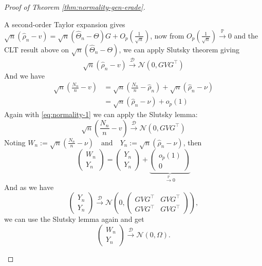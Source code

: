 \begin{proof}[Proof of Theorem \ref{thm:normality-gen-erade}]
\begin{enumerate}[label=(\roman*)]
		A second-order Taylor expansion gives \(\sqrt{n} (\hat{\rho}_n - v) = \sqrt{n} (\hat{\Theta}_n - \Theta) G + O_p\!\left(\frac{1}{\sqrt{n}}\right)\), now from \(O_p\!\left(\frac{1}{\sqrt{n}}\right) \xrightarrow{\mathbb{P}} 0\) and the CLT result above on \(\sqrt n(\hat\Theta_n-\Theta)\), we can apply Slutsky theorem giving
		\begin{equation}\label{eq:normality-1}
			\sqrt{n} (\hat{\rho}_n - v) \xrightarrow{\mathcal{D}} \mathcal{N}(0, GVG^{\top})
		\end{equation}
		And we have
		\begin{align*}
			\sqrt{n} \left( \frac{N_n}{n} - v \right) 
			&= \sqrt{n} \left( \frac{N_n}{n} - \hat{\rho}_n \right)
			+ \sqrt{n} (\hat{\rho}_n - \nu)\\
			&= \sqrt{n} (\hat{\rho}_n - \nu) + o_p(1)
		\end{align*}
		Again with \eqref{eq:normality-1} we can apply the Slutsky lemma:
		\[
		\sqrt{n} \left( \frac{N_n}{n} - v \right) \xrightarrow{\mathcal{D}} \mathcal{N}(0,GVG^{\top})
		\]
		Noting \(W_n := \sqrt{n} \left( \frac{N_n}{n} - \nu \right) 
		\quad \text{and} \quad Y_n := \sqrt{n} (\hat{\rho}_n - \nu)\), then
		\[
		\begin{pmatrix}
			W_n \\
			Y_n
		\end{pmatrix}
		=
		\begin{pmatrix}
			Y_n \\
			Y_n
		\end{pmatrix}
		+
		\underbrace{\begin{pmatrix}
				o_p(1) \\
				0
		\end{pmatrix}}_{\xrightarrow{\mathbb{P}} 0}
		\]
		And as we have
		\[
		\begin{pmatrix}
			Y_n \\
			Y_n
		\end{pmatrix}
		\xrightarrow{\mathcal{D}} 
		\mathcal{N}\left(0,\begin{pmatrix}
			GVG^{\top} & GVG^{\top} \\
			GVG^{\top} & GVG^{\top}
		\end{pmatrix}
		\right),
		\]
		we can use the Slutsky lemma again and get
		\[
		\begin{pmatrix}
			W_n \\
			Y_n
		\end{pmatrix}
		\xrightarrow{\mathcal{D}} \mathcal{N}(0,\Omega).
		\]
	\end{enumerate}	
\end{proof}

